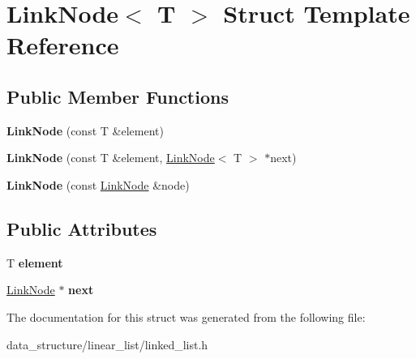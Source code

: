 \hypertarget{structLinkNode}{}\section{Link\+Node$<$ T $>$ Struct Template Reference}
\label{structLinkNode}
\subsection*{Public Member Functions}
\begin{DoxyCompactItemize}
\item 
\mbox{\label{structLinkNode_ad20c724114b18b55476b507b1a2e232a}} 
{\bfseries Link\+Node} (const T \&element)
\item 
\mbox{\label{structLinkNode_a2a596adde87de51c5f6b03399eab2edc}} 
{\bfseries Link\+Node} (const T \&element, \hyperlink{structLinkNode}{Link\+Node}$<$ T $>$ $\ast$next)
\item 
\mbox{\label{structLinkNode_a48b62278ea79f7e3c6f1e0d237d54d08}} 
{\bfseries Link\+Node} (const \hyperlink{structLinkNode}{Link\+Node} \&node)
\end{DoxyCompactItemize}
\subsection*{Public Attributes}
\begin{DoxyCompactItemize}
\item 
\mbox{\label{structLinkNode_ad1ba858aae6858dc555effec6b697faa}} 
T {\bfseries element}
\item 
\mbox{\label{structLinkNode_a19050845bb6742a50b352a3a97e965e2}} 
\hyperlink{structLinkNode}{Link\+Node} $\ast$ {\bfseries next}
\end{DoxyCompactItemize}


The documentation for this struct was generated from the following file\+:\begin{DoxyCompactItemize}
\item 
data\+\_\+structure/linear\+\_\+list/linked\+\_\+list.\+h\end{DoxyCompactItemize}
